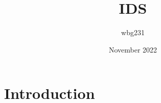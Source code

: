 \documentclass{article}
\title{IDS}
\author{wbg231 }
\date{November 2022}
\begin{document}
\maketitle

\section{Introduction}
\end{document}
